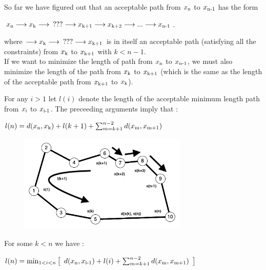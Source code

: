 \documentclass[12pt,letterpaper]{article}
\begin{document}
    So far we have figured out that an acceptable path from $x\textsubscript{n}$ to $x\textsubscript{n-1}$ has the form
    \begin{center}
        $x\textsubscript{n} \longrightarrow  x\textsubscript{k} \longrightarrow \enspace ??? \longrightarrow  x\textsubscript{k+1} \longrightarrow  x\textsubscript{k+2} \longrightarrow  ... \longrightarrow  x\textsubscript{n-1}$.
    \end{center}

    where $\longrightarrow  x\textsubscript{k} \longrightarrow \enspace ??? \longrightarrow  x\textsubscript{k+1}$ is in itself an acceptable path (satisfying all the constraints) from $x\textsubscript{k}$ to $x\textsubscript{k+1}$ with $k < n-1$. \\

    If we want to minimize the length of path from $x\textsubscript{n}$ to $x\textsubscript{n-1}$, we must also minimize the length of the path from $x\textsubscript{k}$ to $x\textsubscript{k+1}$ (which is the same as the length of the acceptable path from $x\textsubscript{k+1}$ to $x\textsubscript{k}$).

    For any $i > 1$ let $l(i)$ denote the length of the acceptable minimum length path from $x\textsubscript{i}$ to $x\textsubscript{i-1}$. The preceeding arguments imply that :

    \begin{center}
        $l(n) = d(x\textsubscript{n}, x\textsubscript{k}) + l(k+1) + \sum_{m=k+1}^{n-2} d(x\textsubscript{m}, x\textsubscript{m+1})$
    \end{center}

    \begin{figure}[htp]
    \centering
        \includegraphics[width=8cm]{TOCFctRDSbmtFSit62.png}

        \label{fig:galaxy}
    \end{figure}

    For some $k < n$ we have :

    \begin{center}
        $l(n) = \min_{1<i<n} \big{[}\enspace d(x\textsubscript{n}, x\textsubscript{i-1}) + l(i) + \sum_{m=k+1}^{n-2} d(x\textsubscript{m}, x\textsubscript{m+1})\enspace  \big{]}$
    \end{center}
\end{document}
